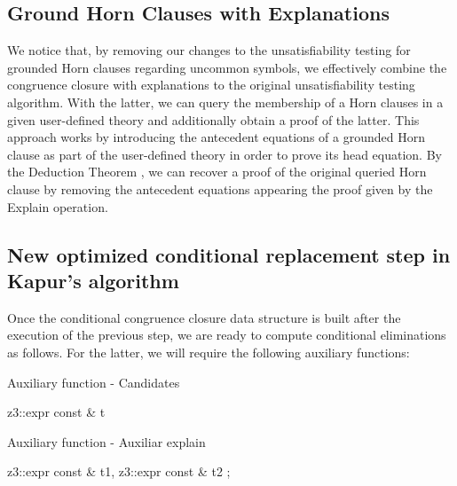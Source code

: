 \subsection{Ground Horn Clauses with Explanations}

We notice that, by removing our changes to the unsatisfiability testing
for grounded Horn clauses regarding uncommon symbols, we effectively combine
the congruence closure with explanations to the original unsatisfiability
testing algorithm. With the latter, we can query the membership of a Horn
clauses in a given user-defined theory and additionally obtain a proof of
the latter. This approach works by introducing the antecedent equations of
a grounded Horn clause as part of the user-defined theory in order to prove
its head equation. By the Deduction Theorem \cite{10.5555/1642730}, we can
recover a proof of the original queried Horn clause by removing the antecedent
equations appearing the proof given by the Explain operation.

\subsection{New optimized conditional replacement step in Kapur's algorithm}

Once the conditional congruence closure data structure is built after 
the execution of the previous step, we are ready to compute conditional eliminations
as follows. For the latter, we will require the following auxiliary functions:

\begin{algorithm}
  \caption{Auxiliary function - Candidates}
  \linespread{\separationline}\selectfont
  \begin{algorithmic}[2]
     {z3::expr const \& t}
    \Else
    \EndIf
    \EndProcedure
  \end{algorithmic}
\end{algorithm}

\begin{algorithm}
  \caption{Auxiliary function - Auxiliar explain}
  \linespread{\separationline}\selectfont
  \begin{algorithmic}[2]
     {z3::expr const \& t1, z3::expr const \& t2}
    \EndIf
    \Else
    ;
    \EndIf
    \Else
    \EndFor
    \EndIf
    \EndIf
    \EndFor
    \EndProcedure
  \end{algorithmic}
\end{algorithm}

